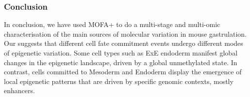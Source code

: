 \subsubsection{Conclusion}

In conclusion, we have used MOFA+ to do a multi-stage and multi-omic characterisation of the main sources of molecular variation in mouse gastrulation. Our suggests that different cell fate commitment events undergo different modes of epigenetic variation. Some cell types such as ExE endoderm manifest global changes in the epigenetic landscape, driven by a global unmethylated state. In contrast, cells committed to Mesoderm and Endoderm display the emergence of local epigenetic patterns that are driven by specific genomic contexts, mostly enhancers.

